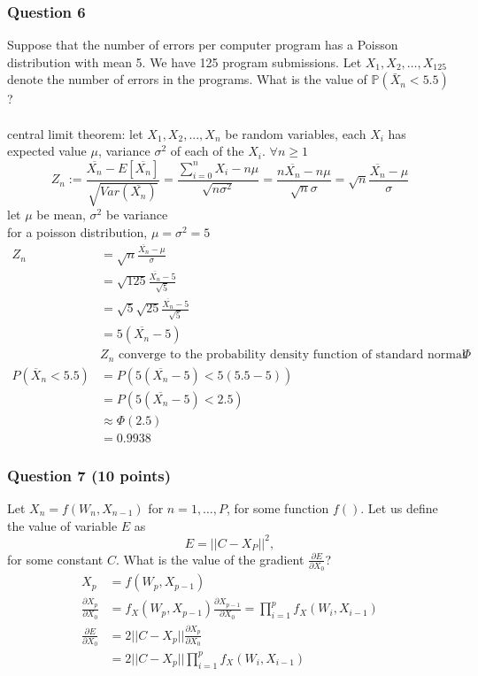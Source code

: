 \documentclass[12pt, border = 4pt, multi]{article} %
\begin{document}
\subsubsection*{Question 6}
Suppose that the number of errors per 
computer program has a Poisson 
distribution with mean 5. 
We have 125 program submissions. 
Let $X_1, X_2, \ldots, X_{125}$ 
denote the number of errors in the 
programs. What is the value of 
$\mathbb{P}(\bar{X}_n < 5.5)$?\\
\\
central limit theorem: let $X_1, X_2, ..., X_n$ be random variables, each $X_i$ has expected value $\mu$, variance $\sigma ^ 2$ of each of the $X_i$. $\forall n \geq 1$
\[Z_n := \frac{\overline{X_n} - E[\overline{X_n}]}{\sqrt{Var(\overline{X_n})}}
= \frac{\sum_{i = 0} ^ n X_i - n\mu}{\sqrt{n\sigma ^ 2}} = \frac{n\overline{X_n} - n\mu}{\sqrt{n}\sigma} = \sqrt{n}\frac{\overline{X_n} - \mu}{\sigma}\]
let $\mu$ be mean, $\sigma ^ 2$ be variance\\
for a poisson distribution, $\mu = \sigma ^ 2 = 5$
\begin{align*}
Z_n &= \sqrt{n}\frac{\overline{X_n} - \mu}{\sigma}\\
&= \sqrt{125}\frac{\overline{X_n} - 5}{\sqrt{5}}\\
&= \sqrt{5}\sqrt{25}\frac{\overline{X_n} - 5}{\sqrt{5}}\\
&= 5(\overline{X_n} - 5)\\
&Z_n \text{ converge to the probability density function of standard normal distribution } \Phi\\
P(\overline{X}_n < 5.5) &= P(5(\overline{X_n} - 5) < 5(5.5 - 5))\\
&= P(5(\overline{X_n} - 5) < 2.5)\\
&\approx \Phi(2.5)\\
&= \boxed{0.9938}
\end{align*}
\subsubsection*{Question 7 (10 points)}
Let $X_n = f(W_n, X_{n-1})$ for 
$n = 1, \ldots, P$, for some 
function $f()$. Let us define the 
value of variable $E$ as 
\begin{equation}
     E = ||C - X_P||^2,
\end{equation}
for some constant $C$. 
What is the value of the gradient 
$\frac{\partial E}{\partial X_0}$?
\\
\begin{align*}
X_p &= f(W_p, X_{p - 1})\\
\frac{\partial X_p}{\partial X_0} &= f_X(W_p, X_{p - 1})\frac{\partial X_{p - 1}}{\partial X_0} = \prod_{i = 1} ^ p f_X(W_i, X_{i - 1})\\
\frac{\partial E}{\partial X_0} &= 2||C - X_p||\frac{\partial X_p}{\partial X_0}\\
&= 2||C - X_p||\prod_{i = 1} ^ p f_X(W_i, X_{i - 1})
\end{align*}
\end{document}
